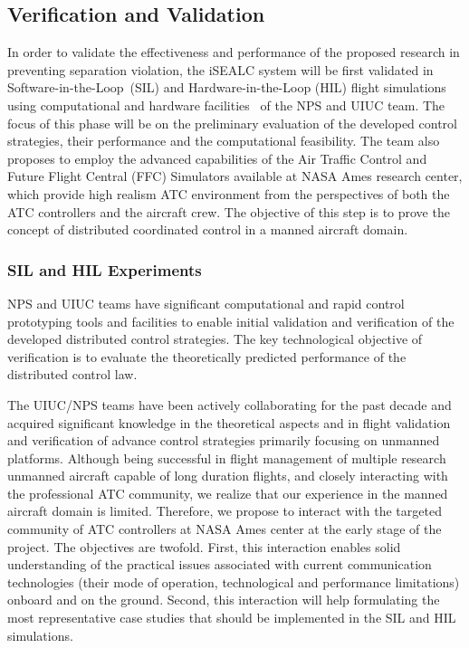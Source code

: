 \documentclass[letter,onecolumn,12pt]{aiaa-tc}
\newcommand{\1}{1_n}
\begin{document}
\subsection{Verification and Validation}

In order to validate the effectiveness and performance of the proposed research in preventing separation violation, the iSEALC system will be first validated in Software-in-the-Loop~(SIL) and Hardware-in-the-Loop (HIL) flight simulations using computational and hardware facilities~\cite{dobrokhodov2013RFCPS} of the NPS and UIUC team. The focus of this phase will be on the preliminary evaluation of the developed control strategies, their performance and the computational feasibility. The team also proposes to employ the advanced capabilities of the Air Traffic Control  and Future Flight Central (FFC) Simulators available at NASA Ames research center\cite{prevot2003distributed}, which provide high realism ATC environment from the perspectives of both the ATC controllers and the aircraft crew. The objective of this step is to prove the concept of distributed coordinated  control in a manned aircraft domain.

\subsubsection{SIL and HIL Experiments}
NPS and UIUC teams have significant computational and rapid control prototyping tools and facilities to enable initial validation and verification of the developed distributed control strategies. The key technological objective of verification is to evaluate the theoretically predicted performance of the distributed control law.

The UIUC/NPS teams have been actively collaborating for the past decade and acquired significant knowledge in the theoretical aspects and in flight validation and verification of advance control strategies primarily focusing on unmanned platforms. Although being successful in flight management of multiple research unmanned aircraft capable of long duration flights, and closely interacting with the professional ATC community, we realize that our experience in the manned aircraft domain is limited. Therefore, we propose to interact with the targeted community of ATC controllers at NASA Ames center at the early stage of the project. The objectives are twofold. First, this interaction enables solid understanding of the practical issues associated with current communication technologies (their mode of operation, technological and performance limitations) onboard and on the ground. Second, this interaction will help formulating the most representative case studies that should be implemented in the SIL and HIL simulations.
\end{document}

